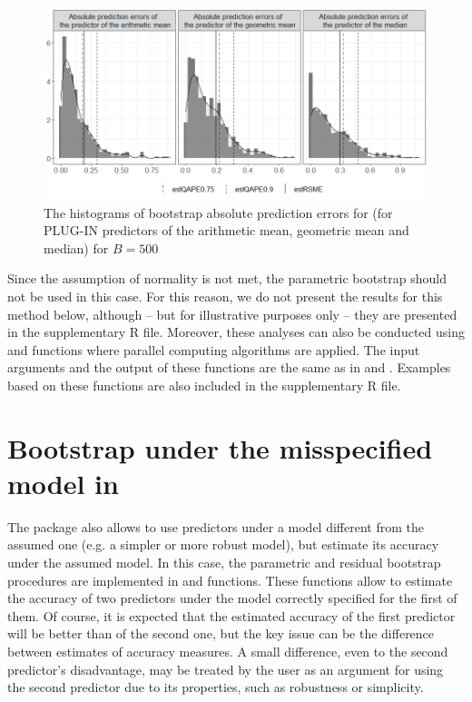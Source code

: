\begin{figure}[h]
\centering
\includegraphics[scale=0.59]{histAll.png}
\caption{The histograms of bootstrap absolute prediction errors for  (for PLUG-IN predictors of the arithmetic mean, geometric mean and median) for $B=500$}\label{hist}
\end{figure}



Since the assumption of normality is not met, the parametric bootstrap should not be used in this case. For this reason, we do not present the results for this method below, although -- but for illustrative purposes only -- they are presented in the supplementary R file. Moreover, these analyses can also be conducted using  and  functions where  parallel computing algorithms are applied. The input arguments and the output of these functions are the same as in  and . Examples based on these functions are also included in the supplementary R file.

\section{Bootstrap under the misspecified model in }
The  package also allows to use predictors under a model different from the assumed one (e.g. a simpler or more robust model), but estimate its accuracy under the assumed model. In this case, the parametric and residual bootstrap procedures are implemented in  and  functions. These functions allow to estimate the accuracy of two predictors under the model correctly specified for the first of them. Of course, it is expected that the estimated accuracy of the first predictor will be better than of the second one, but the key issue can be the difference between estimates of accuracy measures. A small difference, even to the second predictor's disadvantage, may be treated by the user as an argument for using the second predictor due to its properties, such as robustness or simplicity.

